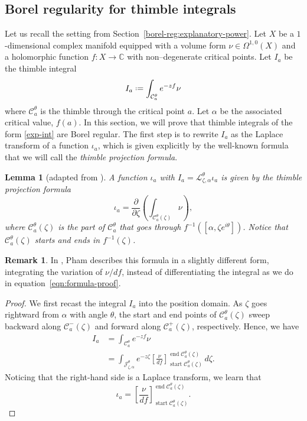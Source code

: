 \documentclass{article}
\newcommand{\C}{\mathbb{C}}
\newcommand*{\defeq}{\mathrel{\vcenter{\baselineskip0.5ex \lineskiplimit0pt
                     \hbox{\scriptsize.}\hbox{\scriptsize.}}}%
                     =}
\newcommand{\laplace}{\mathcal{L}}
\theoremstyle{definition}
\newtheorem{remark}[definition]{Remark}
\theoremstyle{plain}
\newtheorem{lemma}[definition]{Lemma}
\begin{document}
\subsection{Borel regularity for thimble integrals}\label{borel-reg-thimble}
%
Let us recall the setting from Section~\ref{borel-reg:explanatory-power}. Let $X$ be a $1$-dimensional complex manifold equipped with a volume form $\nu \in \Omega^{1,0}(X)$ and a holomorphic function $f\colon X\to\C$ with non--degenerate critical points. Let $I_a$ be the thimble integral 
\begin{equation}\label{exp-int}
I_a \defeq \int_{\mathcal{C}_a^\theta} e^{-zf} \nu
\end{equation}
where $\mathcal{C}_a^\theta$ is the thimble through the critical point $a$. Let $\alpha$ be the associated critical value, $f(a)$. In this section, we will prove that thimble integrals of the form \eqref{exp-int} are Borel regular. The first step is to rewrite $I_a$ as the Laplace transform of a function $\iota_a$, which is given explicitly by the well-known formula that we will call the \textit{thimble projection formula}.
%
\begin{lemma}[adapted from {\cite[Section~3.3]{pham}}]\label{lem:thimble_proj_formula-proof}
A function $\iota_a$ with $I_a = \laplace_{\zeta, \alpha}^\theta \iota_a$ is given by the {\em thimble projection formula}
\begin{equation}\label{eqn:formula-proof}
    \iota_a = \frac{\partial}{\partial \zeta} \left( \int_{\mathcal{C}_a^\theta(\zeta)}\nu \right),
\end{equation}
where $\mathcal{C}_a^\theta(\zeta)$ is the part of $\mathcal{C}_a^\theta$ that goes through $f^{-1}([\alpha,\zeta e^{i\theta}])$. Notice that $\mathcal{C}_a^\theta(\zeta)$ starts and ends in $f^{-1}(\zeta)$.
\end{lemma}
\begin{remark}
In \cite{pham}, Pham describes this formula in a slightly different form, integrating the variation of $\nu/df$, instead of differentiating the integral as we do in equation~\eqref{eqn:formula-proof}.
\end{remark}
\begin{proof}
We first recast the integral $I_a$ into the position domain. As $\zeta$ goes rightward from $\alpha$ with angle $\theta$, the start and end points of $\mathcal{C}_a^\theta(\zeta)$ sweep backward along $\mathcal{C}^-_a(\zeta)$ and forward along $\mathcal{C}^+_a(\zeta)$, respectively. Hence, we have
\begin{align*}
I_a & = \int_{\mathcal{C}_a^\theta} e^{-zf} \nu \\
& = \int_{\mathcal{J}_{\zeta,\alpha}^\theta}e^{-z\zeta} \left[\frac{\nu}{df}\right]_{\operatorname{start} \mathcal{C}_a^\theta(\zeta)}^{\operatorname{end} \mathcal{C}_a^\theta(\zeta)}\,d\zeta.
\end{align*}
Noticing that the right-hand side is a Laplace transform, we learn that
\begin{equation}\label{thimble-difference}
{\iota}_a = \left[\frac{\nu}{df}\right]_{\operatorname{start} \mathcal{C}_a^\theta(\zeta)}^{\operatorname{end} \mathcal{C}_a^\theta(\zeta)}.
\end{equation}
\end{proof}
\end{document}
